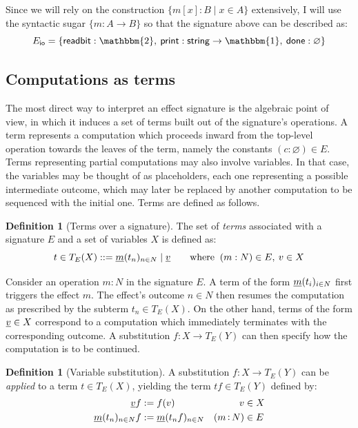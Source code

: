 \documentclass[11pt,oneside,draft]{book}
\theoremstyle{definition}
\newtheorem{definition}[theorem]{Definition}
\newcommand{\kw}[1]{\ensuremath{ \mathsf{#1} }}
\newcommand{\ul}[1]{%
  \underline{\smash{#1}}
}
\begin{document}
Since we will rely on the construction
$\{ m[x] : B \mid x \in A \}$
extensively,
I will use the syntactic sugar
$\{ m : A \rightarrow B \}$
so that the signature above can be described as:
\[
  E_\kw{io} =
  \{ \kw{readbit} : \mathbbm{2}, \:
     \kw{print} : \kw{string} \rightarrow \mathbbm{1}, \:
     \kw{done} : \varnothing \}
\]


\subsection{Computations as terms} %

The most direct way to interpret an effect signature
is the algebraic point of view,
in which it induces a set of terms
built out of the signature's operations.
A term represents a computation which proceeds inward
from the top-level operation
towards the leaves of the term,
namely the constants $(c : \varnothing) \in E$.
Terms representing partial computations may also involve variables.
In that case,
the variables may be thought of as placeholders,
each one representing a possible intermediate outcome,
which may later be replaced by another computation
to be sequenced with the initial one.
Terms are defined as follows.

\begin{definition}[Terms over a signature]
The set of \emph{terms} associated with
a signature $E$ and a set of variables $X$
is defined as:
\[
  t \in T_E(X) ::=
    \ul{m}(t_n)_{n \in N} \mid
    \ul{v}
  \qquad
  \text{where }
  \:
    (m : N) \in E, \:
    v \in X
\]
\end{definition}

Consider an operation $m : N$ in the signature $E$.
A term of the form $\ul{m}(t_i)_{i \in N}$
first triggers the effect $m$.
The effect's outcome $n \in N$ then resumes the computation
as prescribed by the subterm $t_n \in T_E(X)$.
On the other hand,
terms of the form $\ul{v} \in X$ correspond to a computation
which immediately terminates with the corresponding outcome.
A substitution $f : X \rightarrow T_E(Y)$
can then specify how the computation is to be continued.

\begin{definition}[Variable substitution] %
A substitution $f : X \rightarrow T_E(Y)$
can be \emph{applied} to a term $t \in T_E(X)$,
yielding the term $t f \in T_E(Y)$
defined by:
\begin{align*}
  \ul{v} f &:= f(v) & v &\in X \\
  \ul{m}(t_n)_{n \in N} f &:=
    \ul{m}(t_n f)_{n \in N} & (m \mathop: N) &\in E
\end{align*}
\end{definition}
\end{document}
